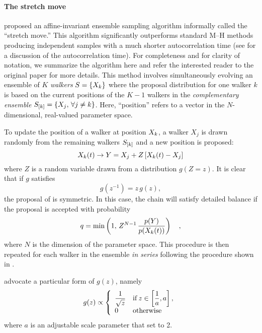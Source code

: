 \paragraph{The stretch move}

 proposed an affine-invariant ensemble sampling
algorithm informally called the ``stretch move.'' This algorithm
significantly outperforms standard M--H methods producing independent
samples with a much shorter autocorrelation time (see  for
a discussion of the autocorrelation time). For completeness and for
clarity of notation, we summarize the algorithm here and refer the interested
reader to the original paper for more details. This method involves
simultaneously evolving an ensemble of $K$ \emph{walkers}
$S = \{ X_k \}$ where the proposal
distribution for one walker $k$ is based on the current positions of the
$K-1$ walkers in the \emph{complementary ensemble}
$S_{[k]} = \{ X_j, \, \forall j \ne k \}$. Here, ``position''
refers to a vector in the $N$-dimensional, real-valued parameter space.


To update the position of a walker at position $X_k$,
a walker $X_j$ is drawn randomly from the remaining walkers $S_{[k]}$
and a new position is proposed:
\begin{equation}
    \eqlabel{proposal}
    \vector{X_k} (t) \to \vector{Y} = \vector{X_j}
            + Z \, [\vector{X_k} (t) - \vector{X_j}]
\end{equation}
where $Z$ is a random variable drawn from a distribution $g(Z = z)$.
It is clear that if $g$ satisfies
\begin{equation}
    g(z^{-1}) = z \, g(z),
\end{equation}
the proposal of  is symmetric. In this case, the chain will
satisfy detailed balance if the proposal is accepted with probability
\begin{equation}
    \eqlabel{acceptance}
    q = \min \left( 1,\, Z^{N-1} \,
                \frac{\pr{\vector{Y}}}{\pr{\vector{X_k} (t)}} \right) \quad,
\end{equation}
where $N$ is the dimension of the parameter space. This procedure is then
repeated for each walker in the ensemble \emph{in series} following the
procedure shown in .

 advocate a particular form of $g(z)$, namely
\begin{equation}
    \eqlabel{goodmanprop}
    g(z) \propto \left \{ \begin{array}{ll}
        \displaystyle\frac{1}{\sqrt{z}} & \mathrm{if}\, z\in
                        \left [ \displaystyle\frac{1}{a}, a \right ], \\
        0 & \mathrm{otherwise}
    \end{array} \right .
\end{equation}
where $a$ is an adjustable scale parameter that  set
to 2.

